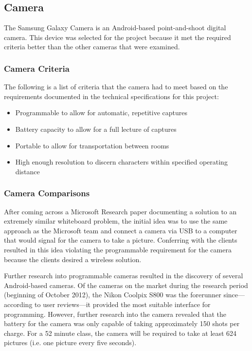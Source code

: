 \documentclass[]{article}
\begin{document}
			\subsection{Camera}
				The Samsung Galaxy Camera is an Android-based point-and-shoot digital camera. This device was selected for the project because it met the required criteria better than the other cameras that were examined. 
				
				\subsubsection{Camera Criteria}
					The following is a list of criteria that the camera had to meet based on the requirements documented in the technical specifications for this project:
					\begin{itemize}
						\item Programmable to allow for automatic, repetitive captures
						\item Battery capacity to allow for a full lecture of captures
						\item Portable to allow for transportation between rooms
						\item High enough resolution to discern characters within specified operating distance
					\end{itemize}
				
				\subsubsection{Camera Comparisons}
					After coming across a Microsoft Research paper documenting a solution to an extremely similar whiteboard problem, the initial idea was to use the same approach as the Microsoft team and connect a camera via USB to a computer that would signal for the camera to take a picture. Conferring with the clients resulted in this idea violating the programmable requirement for the camera because the clients desired a wireless solution. 
					
					Further research into programmable cameras resulted in the discovery of several Android-based cameras. Of the cameras on the market during the research period (beginning of October 2012), the Nikon Coolpix S800 was the forerunner since---according to user reviews---it provided the most suitable interface for programming. However, further research into the camera revealed that the battery for the camera was only capable of taking approximately 150 shots per charge. For a 52 minute class, the camera will be required to take at least 624 pictures (i.e. one picture every five seconds).
					
\end{document}
